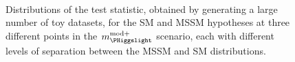 \begin{figure}[h!]
\begin{center}
~\\
\end{center}
\caption[Distributions of the test statistic for the SM and MSSM hypotheses at three different points in the $m_{\PHiggslight}^{\text{mod+}}$ scenario.]{Distributions of the test statistic, obtained by generating a large number of toy datasets, for the \ac{SM} and \ac{MSSM} hypotheses at three different points in the $m_{\PHiggslight}^{\text{mod+}}$
scenario, each with different levels of separation between the \ac{MSSM} and \ac{SM} distributions.}
\label{fig:mssm_mssmvssm_toys}
\end{figure}
\clearpage

